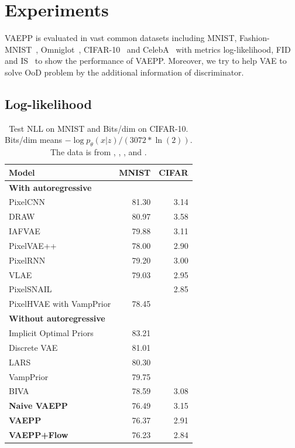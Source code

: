 \section{Experiments}
VAEPP is evaluated in vast common datasets including MNIST, Fashion-MNIST~\cite{xiao2017/online}, Omniglot~\cite{lake2015human}, CIFAR-10~\cite{krizhevsky2009learning} and CelebA~\cite{liu2015deep} with metrics log-likelihood, FID~\cite{heusel2017gans} and IS~\cite{salimans2016improved} to show the performance of VAEPP. Moreover, we try to help VAE to solve OoD problem by the additional information of discriminator. 
\subsection{Log-likelihood}
\begin{table}[tb]
\centering
\begin{tabular}{lrr}  
\toprule
Model  &  MNIST & CIFAR\\
\midrule
\textbf{With autoregressive}   \\
PixelCNN         &  81.30  &  3.14   \\
DRAW             &  80.97  &  3.58    \\
IAFVAE           &  79.88  &  3.11    \\
PixelVAE++       &  78.00  &  2.90   \\
PixelRNN         &  79.20  &  3.00    \\
VLAE             &  79.03  &  2.95     \\
PixelSNAIL       &         & 2.85      \\
PixelHVAE with VampPrior &  78.45  &     \\
\midrule
\textbf{Without autoregressive}   \\
Implicit Optimal Priors & 83.21 \\
Discrete VAE     &  81.01     \\
LARS             &  80.30     \\
VampPrior        &  79.75     \\
BIVA            &  78.59      &    3.08    \\
\textbf{Naive VAEPP}      &  76.49 & 3.15    \\
\textbf{VAEPP}            &  76.37 & 2.91	    \\
\textbf{VAEPP+Flow}       &  76.23 & 2.84    \\
\bottomrule
\end{tabular}
\caption{Test NLL on MNIST and Bits/dim on CIFAR-10. Bits/dim means $-\log p_\theta(x|z) / (3072 * \ln(2))$. The data is from \protect\cite{maaloe2019biva},  \protect\cite{chen2017pixelsnail}, \protect\cite{tomczak2018vae}, \protect\cite{bauer2019resampled} and \protect\cite{takahashi2019variational}. 
}
\end{table}

